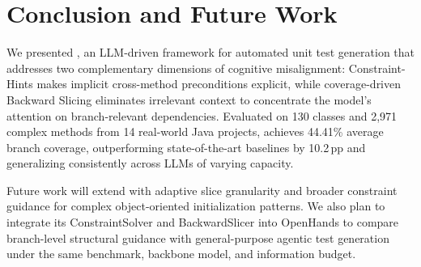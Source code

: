 \section{Conclusion and Future Work}
We presented \ourmethod{}, an LLM-driven framework for automated unit test generation that addresses two complementary dimensions of cognitive misalignment: Constraint-Hints makes implicit cross-method preconditions explicit, while coverage-driven Backward Slicing eliminates irrelevant context to concentrate the model's attention on branch-relevant dependencies. Evaluated on 130 classes and 2{,}971 complex methods from 14 real-world Java projects, \ourmethod{} achieves 44.41\% average branch coverage, outperforming state-of-the-art baselines by 10.2\,pp and generalizing consistently across LLMs of varying capacity.

Future work will extend \ourmethod{} with adaptive slice granularity and broader constraint guidance for complex object-oriented initialization patterns. We also plan to integrate its ConstraintSolver and BackwardSlicer into OpenHands to compare branch-level structural guidance with general-purpose agentic test generation under the same benchmark, backbone model, and information budget.

